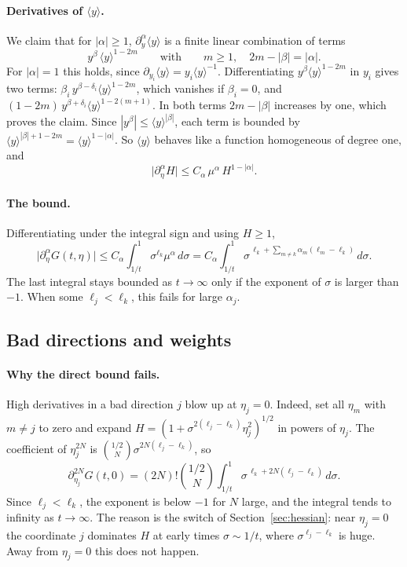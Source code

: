 \documentclass[11pt]{article}
\theoremstyle{remark}
\begin{document}
\paragraph{Derivatives of $\langle y\rangle$.} We claim that for $|\alpha|\ge1$,
$\partial_y^\alpha\langle y\rangle$ is a finite linear combination of terms
\[
y^\beta\,\langle y\rangle^{1-2m}\qquad\text{with}\qquad m\ge1,\quad2m-|\beta|=|\alpha| .
\]
For $|\alpha|=1$ this holds, since $\partial_{y_i}\langle y\rangle=y_i\langle y\rangle^{-1}$.
Differentiating $y^\beta\langle y\rangle^{1-2m}$ in $y_i$ gives two terms:
$\beta_i\,y^{\beta-\delta_i}\langle y\rangle^{1-2m}$, which vanishes if $\beta_i=0$,
and $(1-2m)\,y^{\beta+\delta_i}\langle y\rangle^{1-2(m+1)}$. In both terms
$2m-|\beta|$ increases by one, which proves the claim. Since
$|y^\beta|\le\langle y\rangle^{|\beta|}$, each term is bounded by
$\langle y\rangle^{|\beta|+1-2m}=\langle y\rangle^{1-|\alpha|}$. So $\langle y\rangle$
behaves like a function homogeneous of degree one, and
\begin{equation}\label{eq:Hderiv}
\big|\partial_\eta^\alpha H\big|\le C_\alpha\,\mu^\alpha\,H^{1-|\alpha|} .
\end{equation}

\paragraph{The bound.} Differentiating under the integral sign and using $H\ge1$,
\[
\big|\partial_\eta^\alpha G(t,\eta)\big|
\le C_\alpha\int_{1/t}^1\sigma^{\ell_k}\mu^\alpha\,d\sigma
=C_\alpha\int_{1/t}^1\sigma^{\,\ell_k+\sum_{m\ne k}\alpha_m(\ell_m-\ell_k)}\,d\sigma .
\]
The last integral stays bounded as $t\to\infty$ only if the exponent of $\sigma$ is
larger than $-1$. When some $\ell_j<\ell_k$, this fails for large $\alpha_j$.

\subsection{Bad directions and weights}

\paragraph{Why the direct bound fails.} High derivatives in a bad direction $j$ blow
up at $\eta_j=0$. Indeed, set all $\eta_m$ with $m\ne j$ to zero and expand
$H=(1+\sigma^{2(\ell_j-\ell_k)}\eta_j^2)^{1/2}$ in powers of $\eta_j$. The
coefficient of $\eta_j^{2N}$ is $\binom{1/2}{N}\sigma^{2N(\ell_j-\ell_k)}$, so
\[
\partial_{\eta_j}^{2N}G(t,0)=(2N)!\binom{1/2}{N}\int_{1/t}^1\sigma^{\,\ell_k+2N(\ell_j-\ell_k)}\,d\sigma .
\]
Since $\ell_j<\ell_k$, the exponent is below $-1$ for $N$ large, and the integral
tends to infinity as $t\to\infty$. The reason is the switch of
Section~\ref{sec:hessian}: near $\eta_j=0$ the coordinate $j$ dominates $H$ at early
times $\sigma\sim1/t$, where $\sigma^{\ell_j-\ell_k}$ is huge. Away from $\eta_j=0$
this does not happen.
\end{document}
